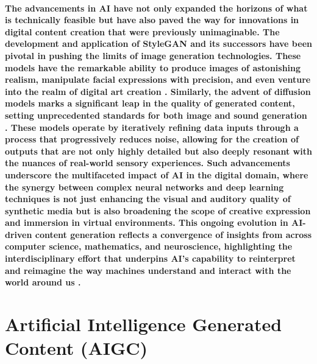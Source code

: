 \documentclass[11pt,a4paper,oneside]{report}
\begin{document}
\paragraph{The advancements in AI have not only expanded the horizons of what is technically feasible but have also paved the way for innovations in digital content creation that were previously unimaginable. 
The development and application of StyleGAN \cite{karras2019style} and its successors have been pivotal in pushing the limits of image generation technologies. 
These models have the remarkable ability to produce images of astonishing realism, manipulate facial expressions with precision, and even venture into the realm of digital art creation \cite{patashnik2021styleclip}. 
Similarly, the advent of diffusion models marks a significant leap in the quality of generated content, setting unprecedented standards for both image and sound generation \cite{rombach2022high}. 
These models operate by iteratively refining data inputs through a process that progressively reduces noise, allowing for the creation of outputs that are not only highly detailed but also deeply resonant with the nuances of real-world sensory experiences. 
Such advancements underscore the multifaceted impact of AI in the digital domain, where the synergy between complex neural networks and deep learning techniques is not just enhancing the visual and auditory quality of synthetic media but is also broadening the scope of creative expression and immersion in virtual environments. 
This ongoing evolution in AI-driven content generation reflects a convergence of insights from across computer science, mathematics, and neuroscience, highlighting the interdisciplinary effort that underpins AI's capability to reinterpret and reimagine the way machines understand and interact with the world around us \cite{silver2016mastering}.}

\section{Artificial Intelligence Generated Content (AIGC)}
\end{document}
